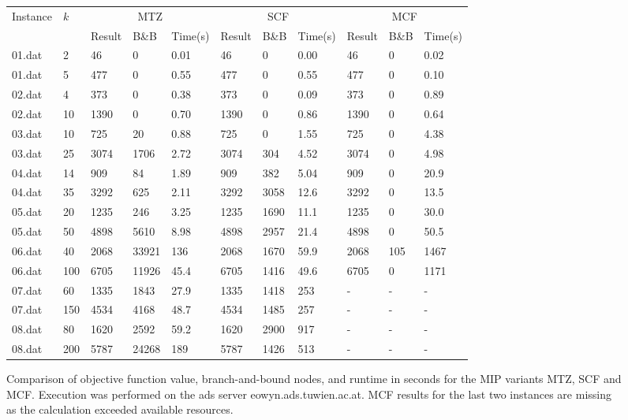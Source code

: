 \documentclass{article}
\begin{document}
\begin{figure}[H]
\centering
\begin{tabular}{lllllllllll}
\toprule
Instance & $k$ & \multicolumn{3}{c}{MTZ} & \multicolumn{3}{c}{SCF} & \multicolumn{3}{c}{MCF} \\
& & Result & B\&B & Time(s) &
    Result & B\&B & Time(s) &
    Result & B\&B & Time(s) \\
\midrule
01.dat & 2   & 46   & 0     & 0.01 & 46   & 0    & 0.00 & 46   & 0   & 0.02 \\
01.dat & 5   & 477  & 0     & 0.55 & 477  & 0    & 0.55 & 477  & 0   & 0.10 \\
02.dat & 4   & 373  & 0     & 0.38 & 373  & 0    & 0.09 & 373  & 0   & 0.89 \\
02.dat & 10  & 1390 & 0     & 0.70 & 1390 & 0    & 0.86 & 1390 & 0   & 0.64 \\
03.dat & 10  & 725  & 20    & 0.88 & 725  & 0    & 1.55 & 725  & 0   & 4.38 \\
03.dat & 25  & 3074 & 1706  & 2.72 & 3074 & 304  & 4.52 & 3074 & 0   & 4.98 \\
04.dat & 14  & 909  & 84    & 1.89 & 909  & 382  & 5.04 & 909  & 0   & 20.9 \\
04.dat & 35  & 3292 & 625   & 2.11 & 3292 & 3058 & 12.6 & 3292 & 0   & 13.5 \\
05.dat & 20  & 1235 & 246   & 3.25 & 1235 & 1690 & 11.1 & 1235 & 0   & 30.0 \\
05.dat & 50  & 4898 & 5610  & 8.98 & 4898 & 2957 & 21.4 & 4898 & 0   & 50.5 \\
06.dat & 40  & 2068 & 33921 & 136  & 2068 & 1670 & 59.9 & 2068 & 105 & 1467 \\
06.dat & 100 & 6705 & 11926 & 45.4 & 6705 & 1416 & 49.6 & 6705 & 0   & 1171 \\
07.dat & 60  & 1335 & 1843  & 27.9 & 1335 & 1418 & 253  & -    & - & - \\
07.dat & 150 & 4534 & 4168  & 48.7 & 4534 & 1485 & 257  & -    & - & - \\
08.dat & 80  & 1620 & 2592  & 59.2 & 1620 & 2900 & 917  & -    & - & - \\
08.dat & 200 & 5787 & 24268 & 189  & 5787 & 1426 & 513  & -    & - & - \\
\bottomrule
\end{tabular}
\caption{Comparison of objective function value, branch-and-bound nodes, and runtime in seconds for the MIP variants MTZ, SCF and MCF. Execution was performed on the ads server eowyn.ads.tuwien.ac.at. MCF results for the last two instances are missing as the calculation exceeded available resources.} 
\label{fig:go}
\end{figure}
\end{document}
